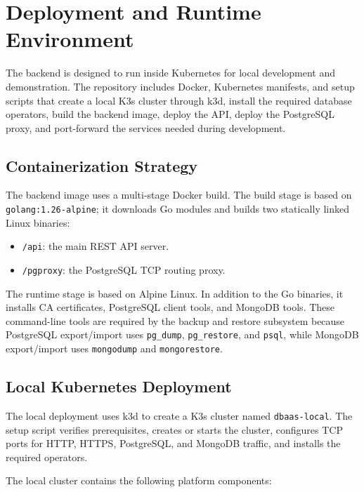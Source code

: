 \section{Deployment and Runtime Environment}

The backend is designed to run inside Kubernetes for local development and demonstration. The repository includes Docker, Kubernetes manifests, and setup scripts that create a local K3s cluster through k3d, install the required database operators, build the backend image, deploy the API, deploy the PostgreSQL proxy, and port-forward the services needed during development.

\subsection{Containerization Strategy}

The backend image uses a multi-stage Docker build. The build stage is based on \texttt{golang:1.26-alpine}; it downloads Go modules and builds two statically linked Linux binaries:

\begin{itemize}
    \item \texttt{/api}: the main REST API server.
    \item \texttt{/pgproxy}: the PostgreSQL TCP routing proxy.
\end{itemize}

The runtime stage is based on Alpine Linux. In addition to the Go binaries, it installs CA certificates, PostgreSQL client tools, and MongoDB tools. These command-line tools are required by the backup and restore subsystem because PostgreSQL export/import uses \texttt{pg\_dump}, \texttt{pg\_restore}, and \texttt{psql}, while MongoDB export/import uses \texttt{mongodump} and \texttt{mongorestore}.

\subsection{Local Kubernetes Deployment}

The local deployment uses k3d to create a K3s cluster named \texttt{dbaas-local}. The setup script verifies prerequisites, creates or starts the cluster, configures TCP ports for HTTP, HTTPS, PostgreSQL, and MongoDB traffic, and installs the required operators.

The local cluster contains the following platform components:


